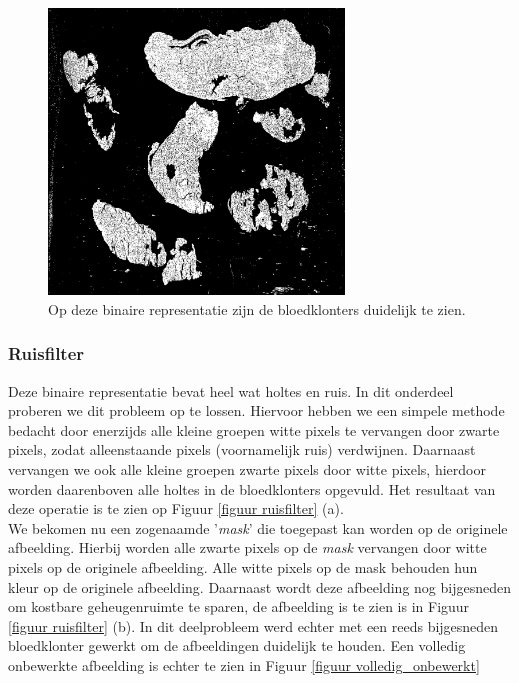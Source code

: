 \documentclass[a4paper,kulak]{kulakarticle}
\begin{document}
\begin{figure}[H]
	\centering
	\includegraphics[width=0.7\textwidth]{grijswaarden_bin_vb}
	\caption{Op deze binaire representatie zijn de bloedklonters duidelijk te zien.}
	\label{figuur foto_bin}
\end{figure}

\subsubsection{Ruisfilter}
Deze binaire representatie bevat heel wat holtes en ruis. In dit onderdeel proberen we dit probleem op te lossen. Hiervoor hebben we een simpele methode bedacht door enerzijds alle kleine groepen witte pixels te vervangen door zwarte pixels, zodat alleenstaande pixels (voornamelijk ruis) verdwijnen. Daarnaast vervangen we ook alle kleine groepen zwarte pixels door witte pixels, hierdoor worden daarenboven alle holtes in de bloedklonters opgevuld. Het resultaat van deze operatie is te zien op Figuur \ref{figuur ruisfilter} (a). \\
We bekomen nu een zogenaamde '\textit{mask}' die toegepast kan worden op de originele afbeelding. Hierbij worden alle zwarte pixels op de \textit{mask} vervangen door witte pixels op de originele afbeelding. Alle witte pixels op de mask behouden hun kleur op de originele afbeelding. Daarnaast wordt deze afbeelding nog bijgesneden om kostbare geheugenruimte te sparen, de afbeelding is te zien is in Figuur \ref{figuur ruisfilter} (b). In dit deelprobleem werd echter met een reeds bijgesneden bloedklonter gewerkt om de afbeeldingen duidelijk te houden. Een volledig onbewerkte afbeelding is echter te zien in Figuur \ref{figuur volledig_onbewerkt}
\end{document}
